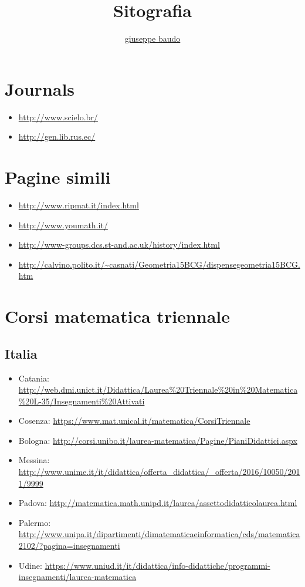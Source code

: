 \documentclass[a4paper,10pt]{article}
\title{Sitografia}
\author{\href{http://www.baudo.hol.es}{giuseppe baudo}}
\begin{document}
\maketitle

\section{Journals}
\begin{itemize}
 \item \url{http://www.scielo.br/}
 \item \url{http://gen.lib.rus.ec/}
\end{itemize}

\section{Pagine simili}
\begin{itemize}
 \item \url{http://www.ripmat.it/index.html}
 \item \url{http://www.youmath.it/}
 \item \url{http://www-groups.dcs.st-and.ac.uk/history/index.html}
 \item \url{http://calvino.polito.it/~casnati/Geometria15BCG/dispensegeometria15BCG.htm}
\end{itemize}

\section{Corsi matematica triennale}
\subsection*{Italia}
\begin{itemize}
 \item Catania: \url{http://web.dmi.unict.it/Didattica/Laurea%20Triennale%20in%20Matematica%20L-35/Insegnamenti%20Attivati}
 \item Cosenza: \url{https://www.mat.unical.it/matematica/CorsiTriennale}
 \item Bologna: \url{http://corsi.unibo.it/laurea-matematica/Pagine/PianiDidattici.aspx}
 \item Messina: \url{http://www.unime.it/it/didattica/offerta_didattica/_offerta/2016/10050/2011/9999}
 \item Padova: \url{http://matematica.math.unipd.it/laurea/assettodidatticolaurea.html}
 \item Palermo: \url{http://www.unipa.it/dipartimenti/dimatematicaeinformatica/cds/matematica2102/?pagina=insegnamenti}
 \item Udine: \url{https://www.uniud.it/it/didattica/info-didattiche/programmi-insegnamenti/laurea-matematica}
\end{itemize}
\end{document}

